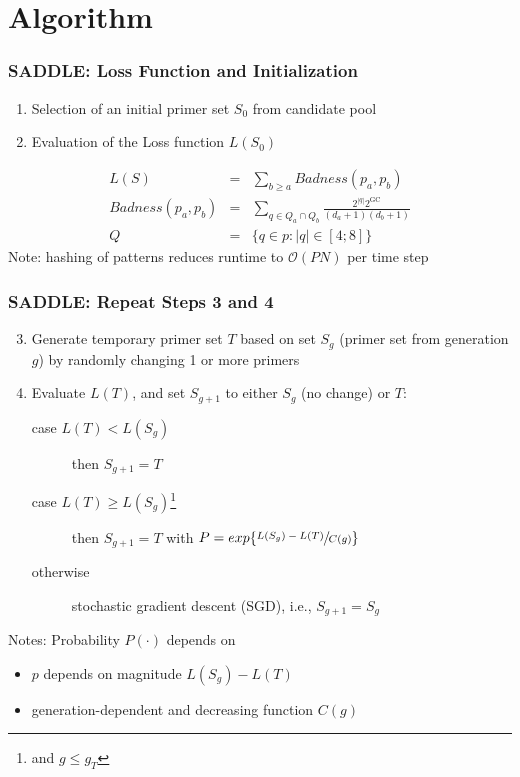 \documentclass[xcolor=dvipsnames,envcountsect]{beamer}
\newcommand{\pfwd}{$\text{p}_{\text{fwd}}$}
\newcommand{\prev}{$\text{p}_{\text{rev}}$}
\begin{document}
\section{Algorithm}
\begin{frame}\frametitle{SADDLE: Loss Function and Initialization}
\begin{enumerate}
    \item Selection of an initial primer set $S_0$ from candidate pool
    \item Evaluation of the Loss function $L(S_0)$
\end{enumerate}
\begin{eqnarray}
    L(S) &=& \sum_{b\geq a} Badness(p_a, p_b)\\
    Badness(p_a, p_b) &=& \sum_{q\in Q_a \cap Q_b} \frac{2^{|q|} 2^{\text{GC}}}{(d_a + 1)(d_b + 1)}\\
    Q&=&\{ q\in p: | q| \in [4;8]\}
\end{eqnarray}
Note: hashing of patterns reduces runtime to $\mathcal{O}(PN)$ per time step
\end{frame}

\begin{frame}\frametitle{SADDLE: Repeat Steps 3 and 4} %
\begin{enumerate}
    \setcounter{enumi}{2}
    \item Generate temporary primer set $T$ based on set $S_g$ (primer set from generation $g$) by randomly changing 1 or more primers
    \item Evaluate $L(T)$, and set $S_{g+1}$ to either $S_g$ (no change) or $T$:
    \begin{description}
        \item[case $L(T) < L(S_g)$] then $S_{g+1} = T$
        \item[case $L(T) \geq L(S_g)$\footnote{and $g \leq g_T$}] then $S_{g+1} = T$ with $P = exp\{\sfrac{L(S_g) - L(T)}{C(g)}\}$
        \item[otherwise] stochastic gradient descent (SGD), i.e., $S_{g+1} = S_g$
    \end{description}
    
\end{enumerate}
Notes: Probability $P(\cdot)$ depends on
\begin{itemize}
    \item $p$ depends on magnitude $L(S_g) - L(T)$ %
    \item generation-dependent and decreasing function $C(g)$
\end{itemize}
\end{frame}
\end{document}
